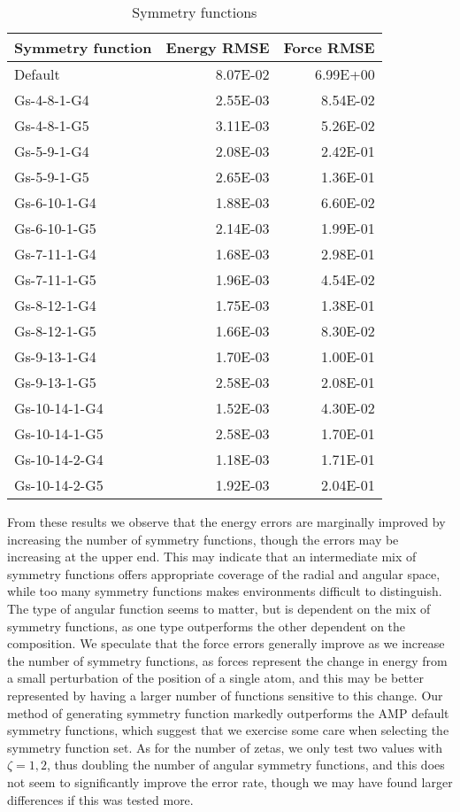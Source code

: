 \begin{table}[H]
\centering
\begin{tabular}{lrr}
\toprule
Symmetry function &  Energy RMSE &  Force RMSE \\
\midrule
          Default &     8.07E-02 &    6.99E+00 \\
      Gs-4-8-1-G4 &     2.55E-03 &    8.54E-02 \\
      Gs-4-8-1-G5 &     3.11E-03 &    5.26E-02 \\
      Gs-5-9-1-G4 &     2.08E-03 &    2.42E-01 \\
      Gs-5-9-1-G5 &     2.65E-03 &    1.36E-01 \\
     Gs-6-10-1-G4 &     1.88E-03 &    6.60E-02 \\
     Gs-6-10-1-G5 &     2.14E-03 &    1.99E-01 \\
     Gs-7-11-1-G4 &     1.68E-03 &    2.98E-01 \\
     Gs-7-11-1-G5 &     1.96E-03 &    4.54E-02 \\
     Gs-8-12-1-G4 &     1.75E-03 &    1.38E-01 \\
     Gs-8-12-1-G5 &     1.66E-03 &    8.30E-02 \\
     Gs-9-13-1-G4 &     1.70E-03 &    1.00E-01 \\
     Gs-9-13-1-G5 &     2.58E-03 &    2.08E-01 \\
    Gs-10-14-1-G4 &     1.52E-03 &    4.30E-02 \\
    Gs-10-14-1-G5 &     2.58E-03 &    1.70E-01 \\
    Gs-10-14-2-G4 &     1.18E-03 &    1.71E-01 \\
    Gs-10-14-2-G5 &     1.92E-03 &    2.04E-01 \\
\bottomrule
\end{tabular}
\caption{Symmetry functions}
\label{table:symmetry}
\end{table}

From these results we observe that the energy errors are marginally
improved by increasing the number of symmetry functions, though the
errors may be increasing at the upper end. This may indicate
that an intermediate mix of symmetry functions offers appropriate
coverage of the radial and angular space, while too many symmetry
functions makes environments difficult to distinguish.
The type of angular function seems to matter, but is dependent
on the mix of symmetry functions, as one type outperforms the other
dependent on the composition.
We speculate that the force errors generally improve as we increase
the number of symmetry functions, as forces represent the change in energy
from a small perturbation of the position of a single atom,
and this may be better represented by having a larger number of functions
sensitive to this change.
Our method of generating symmetry function markedly outperforms
the AMP default symmetry functions, which suggest that we exercise
some care when selecting the symmetry function set.
As for the number of zetas, we only test two values with
$\zeta = 1, 2$, thus doubling the number of angular symmetry functions,
and this does not seem to significantly improve the error rate,
though we may have found larger differences if this was tested more.

